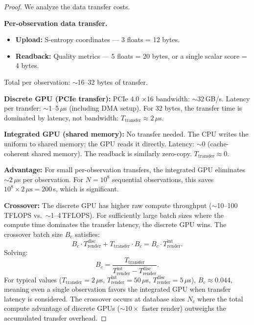 \documentclass[11pt,twocolumn,a4paper]{article}
\begin{document}
\begin{proof}
We analyze the data transfer costs.

\textbf{Per-observation data transfer.}
\begin{itemize}[leftmargin=*]
\item \textbf{Upload:} S-entropy coordinates --- 3 floats = 12 bytes.
\item \textbf{Readback:} Quality metrics --- 5 floats = 20 bytes,
  or a single scalar score = 4 bytes.
\end{itemize}
Total per observation: $\sim$16--32 bytes of transfer.

\textbf{Discrete GPU (PCIe transfer):}
PCIe 4.0 $\times$16 bandwidth: $\sim$32\,GB/s. Latency per
transfer: $\sim$1--5\,$\mu$s (including DMA setup). For 32 bytes,
the transfer time is dominated by latency, not bandwidth:
$T_{\mathrm{transfer}} \approx 2\,\mu$s.

\textbf{Integrated GPU (shared memory):}
No transfer needed. The CPU writes the uniform to shared memory;
the GPU reads it directly. Latency: $\sim$0 (cache-coherent shared
memory). The readback is similarly zero-copy.
$T_{\mathrm{transfer}} \approx 0$.

\textbf{Advantage:} For small per-observation transfers, the
integrated GPU eliminates $\sim$2\,$\mu$s per observation. For
$N = 10^8$ sequential observations, this saves
$10^8 \times 2\,\mu\text{s} = 200$\,s, which is significant.

\textbf{Crossover:} The discrete GPU has higher raw compute
throughput ($\sim$10--100\,TFLOPS vs.\ $\sim$1--4\,TFLOPS). For
sufficiently large batch sizes where the compute time dominates the
transfer latency, the discrete GPU wins. The crossover batch size
$B_c$ satisfies:
\begin{equation}
B_c \cdot T_{\mathrm{render}}^{\mathrm{disc}}
  + T_{\mathrm{transfer}} \cdot B_c
= B_c \cdot T_{\mathrm{render}}^{\mathrm{int}}.
\end{equation}
Solving:
\begin{equation}
B_c = \frac{T_{\mathrm{transfer}}}{T_{\mathrm{render}}^{\mathrm{int}}
  - T_{\mathrm{render}}^{\mathrm{disc}}}.
\end{equation}
For typical values ($T_{\mathrm{transfer}} = 2\,\mu$s,
$T_{\mathrm{render}}^{\mathrm{int}} = 50\,\mu$s,
$T_{\mathrm{render}}^{\mathrm{disc}} = 5\,\mu$s), $B_c \approx
0.044$, meaning even a single observation favors the integrated GPU
when transfer latency is considered. The crossover occurs at
database sizes $N_c$ where the total compute advantage of discrete
GPUs ($\sim\!10\times$ faster render) outweighs the accumulated
transfer overhead.


\end{proof}
\end{document}
